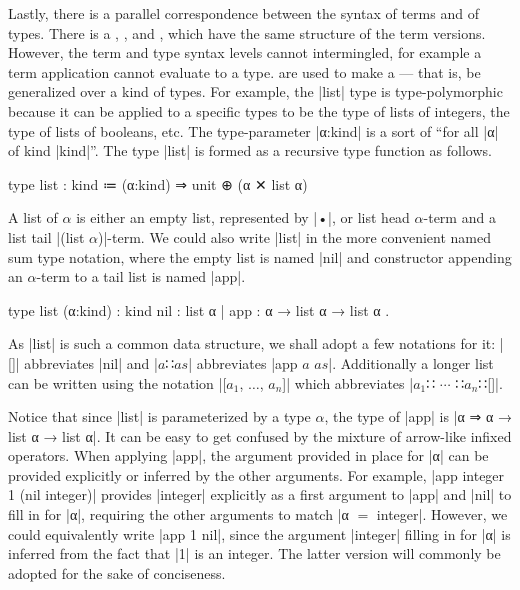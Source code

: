 Lastly, there is a parallel correspondence between the syntax of terms and of types.
There is a , , and , which have the same structure of the term versions.
However, the term and type syntax levels cannot intermingled, for example a term application cannot evaluate to a type.
 are used to make a  --- that is, be generalized over a kind of types.
For example, the \code|list| type is type-polymorphic because it can be applied to a specific types to be the type of lists of integers, the type of lists of booleans, etc.
The type-parameter \code|α:kind| is a sort of ``for all \code|α| of kind \code|kind|''.
The type \code|list| is formed as a recursive type function as follows.
%
\begin{snippet}
type list : kind ≔ (α:kind) ⇒ unit ⊕ (α ✕ list α)
\end{snippet}
%
A list of $α$ is either an empty list, represented by \code|•|, or list head $α$-term and a list tail \code|(list $α$)|-term.
We could also write \code|list| in the more convenient named sum type notation, where the empty list is named \code|nil| and constructor appending an $α$-term to a tail list is named \code|app|.
%
\begin{snippet}
type list (α:kind) : kind
  { nil : list α
  | app : α → list α → list α }.
\end{snippet}
%
As \code|list| is such a common data structure, we shall adopt a few notations for it: \code|[]| abbreviates \code|nil| and \code|$a$∷$as$| abbreviates \code|app $a$ $as$|.
Additionally a longer list can be written using the notation \code|[$a_1$, $\dots$, $a_n$]| which abbreviates \code|$a_1$∷ $\cdots$ ∷$a_n$∷[]|.

Notice that since \code|list| is parameterized by a type $α$, the type of \code|app| is \code|α ⇒ α → list α → list α|.
It can be easy to get confused by the mixture of arrow-like infixed operators.
When applying \code|app|, the argument provided in place for \code|α| can be provided explicitly or inferred by the other arguments.
For example, \code|app integer 1 (nil integer)| provides \code|integer| explicitly as a first argument to \code|app| and \code|nil| to fill in for \code|α|, requiring the other arguments to match \code|α $=$ integer|.
However, we could equivalently write \code|app 1 nil|, since the argument \code|integer| filling in for \code|α| is inferred from the fact that \code|1| is an integer.
The latter version will commonly be adopted for the sake of conciseness.

